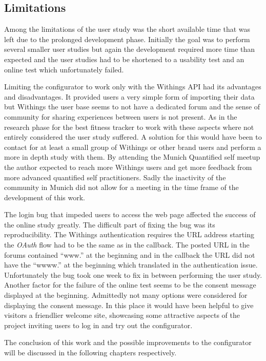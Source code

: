 \documentclass[../medieninformatik-arbeit.tex]{subfiles}
\begin{document}
\subsection{Limitations}
Among the limitations of the user study was the short available time that was left due to the prolonged development phase. Initially the goal was to perform several smaller user studies but again the development required more time than expected and the user studies had to be shortened to a usability test and an online test which unfortunately failed. 

Limiting the configurator to work only with the Withings API had its advantages and disadvantages. It provided users a very simple form of importing their data but Withings the user base seems to not have a dedicated forum and the sense of community for sharing experiences between users is not present. As in the research phase for the best fitness tracker to work with these aspects where not entirely considered the user study suffered. A solution for this would have been to contact for at least a small group of Withings or other brand users and perform a more in depth study with them. By attending the Munich Quantified self meetup the author expected to reach more Withings users and get more feedback from more advanced quantified self practitioners. Sadly the inactivity of the community in Munich did not allow for a meeting in the time frame of the development of this work. 

The login bug that impeded users to access the web page affected the success of the online study greatly. The difficult part of fixing the bug was its reproducibility. The Withings authentication requires the URL address starting the \textit{OAuth} flow had to be the same as in the callback. The posted URL in the forums contained ``www.'' at the beginning and in the callback the URL did not have the ``wwww.'' at the beginning which translated in the authentication issue. Unfortunately the bug took one week to fix in between performing the user study. Another factor for the failure of the online test seems to be the consent message displayed at the beginning. Admittedly not many options were considered for displaying the consent message. In this place it would have been helpful to give visitors a friendlier welcome site, showcasing some attractive aspects of the project inviting users to log in and try out the configurator. 

The conclusion of this work and the possible improvements to the configurator will be discussed in the following chapters respectively. 
\end{document}
